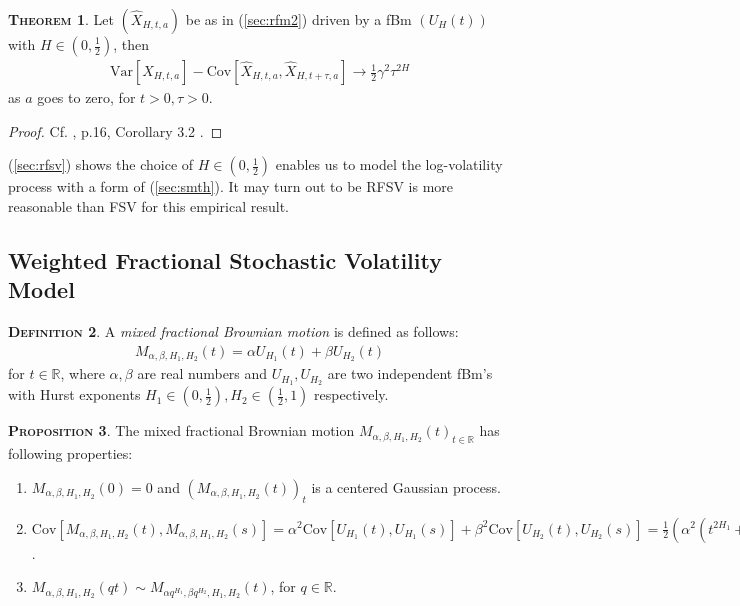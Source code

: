 \documentclass[a4paper, twoside, 11pt]{article}
\theoremstyle{definition}
\newtheorem{definition}{\scshape Definition}[section]
\newtheorem{theorem}[definition]{\scshape Theorem}
\newtheorem{proposition}[definition]{\scshape Proposition}
\newcommand{\brkt}[1]{\left({#1} \right)}
\begin{document}
\begin{theorem}
  Let $(\hat{X}_{H, t, a})$ be as in (\ref{sec:rfm2}) driven by a fBm $(U_H(t))$ with $H\in(0, \frac{1}{2})$, then 
  \begin{eqnarray}
	\mathrm{Var}[\hat{X}_{H,t, a}] - \mathrm{Cov}[\hat{X}_{H,t, a}, \hat{X}_{H,t+\tau, a}] \rightarrow \frac{1}{2} \gamma^2\tau^{2H}
	\label{sec:rfsv}
  \end{eqnarray}
 as $a$ goes to zero, for $t>0, \tau>0$.
\end{theorem}
\begin{proof}
  Cf. \cite{gradin}, p.16, Corollary 3.2 .
\end{proof}

(\ref{sec:rfsv}) shows the choice of $H\in(0,\frac{1}{2})$ enables us to model the log-volatility process with a form of (\ref{sec:smth}). It may turn out to be RFSV is more reasonable than FSV for this empirical result.

\subsection{Weighted Fractional Stochastic Volatility Model}
\begin{definition}
  A \emph{mixed fractional Brownian motion} is defined as follows:
\begin{eqnarray}
  M_{\alpha,\beta,H_1,H_2}(t) = \alpha U_{H_1}(t) + \beta U_{H_2}(t)
  \label{sec:mfsv}
\end{eqnarray}
for $t\in \mathbb{R}$, where $\alpha, \beta$ are real numbers and $U_{H_1}, U_{H_2}$ are two independent fBm's with Hurst exponents $H_1 \in (0, \frac{1}{2}), H_2 \in (\frac{1}{2}, 1)$ respectively.
\end{definition}

\begin{proposition}
  The mixed fractional Brownian motion $M_{\alpha,\beta,H_1,H_2}(t)_{t\in\mathbb{R}}$ has following properties:
   \begin{enumerate}[topsep=0pt, itemsep=-1ex, partopsep=1ex, parsep=1ex, label=(\roman*)]
	 \item $M_{\alpha,\beta,H_1,H_2}(0) = 0$ and $(M_{\alpha,\beta,H_1,H_2}(t))_t$ is a centered Gaussian  process.
	 \item $\mathrm{Cov}[M_{\alpha,\beta,H_1,H_2}(t), M_{\alpha,\beta,H_1,H_2}(s)] = \alpha^2 \mathrm{Cov}[U_{H_1}(t), U_{H_1}(s)] + \beta^2\mathrm{Cov}[U_{H_2}(t), U_{H_2}(s)] = \frac{1}{2}\brkt{\alpha^2(t^{2H_1}+s^{2H_1}+|t-s|^{2H_1}) + \beta^2(t^{2H_2} + s^{2H_2} + |t-s|^{2H_2})}$. 
	 \item $M_{\alpha, \beta, H_1, H_2}(qt) \sim M_{\alpha q^{H_1}, \beta q^{H_2}, H_1, H_2}(t)$, for $q\in\mathbb{R}$.
	 \end{enumerate}
	 \label{sec:prop}
\end{proposition}
\end{document}
